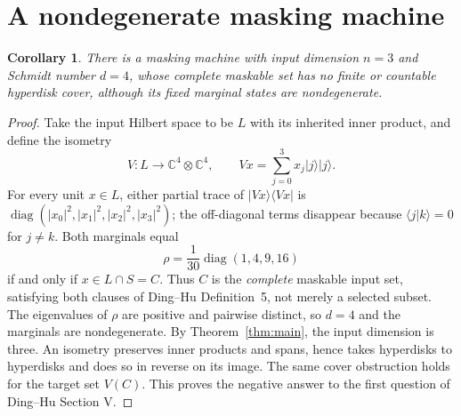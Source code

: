 \documentclass[11pt]{article}
\newtheorem{corollary}[theorem]{Corollary}
\newcommand{\C}{\mathbb C}
\newcommand{\diag}{\operatorname{diag}}
\begin{document}
\section{A nondegenerate masking machine}
\begin{corollary}\label{cor:masker}
There is a masking machine with input dimension $n=3$ and Schmidt
number $d=4$, whose complete maskable set has no finite or countable
hyperdisk cover, although its fixed marginal states are nondegenerate.
\end{corollary}
\begin{proof}
Take the input Hilbert space to be $L$ with its inherited inner product,
and define the isometry
\[
 V:L\longrightarrow\C^4\otimes\C^4,\qquad
 Vx=\sum_{j=0}^3x_j|j\rangle|j\rangle.
\]
For every unit $x\in L$, either partial trace of $|Vx\rangle\langle Vx|$
is $\diag(|x_0|^2,|x_1|^2,|x_2|^2,|x_3|^2)$; the off-diagonal
terms disappear because $\langle j|k\rangle=0$ for $j\ne k$.
Both marginals equal
\[
 \rho=\frac1{30}\diag(1,4,9,16)
\]
if and only if $x\in L\cap S=C$. Thus $C$ is the \emph{complete}
maskable input set, satisfying both clauses of Ding--Hu Definition~5,
not merely a selected subset. The eigenvalues of $\rho$ are positive
and pairwise distinct, so $d=4$ and the marginals are nondegenerate.
By Theorem~\ref{thm:main}, the input dimension is three. An isometry
preserves inner products and spans, hence takes hyperdisks to hyperdisks
and does so in reverse on its image. The same cover obstruction holds
for the target set $V(C)$. This proves the negative answer to the first
question of Ding--Hu Section V.
\end{proof}
\end{document}
